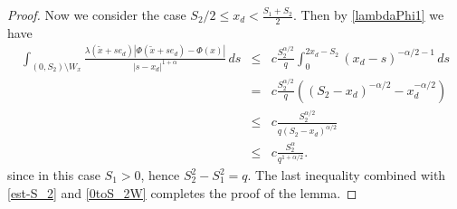 \documentclass[a4paper,12pt,reqno]{amsart}
\theoremstyle{definition}
\theoremstyle{remark}
\begin{document}
\begin{proof}
Now we consider  the case $S_2/2\le x_d< \frac{S_1+S_2}2$.   Then by \eqref{lambdaPhi1}    we have
\begin{eqnarray*}
\int_{(0, S_2) \setminus W_x} 
\frac{\lambda(\tilde{x} + s e_d) |\varPhi(\tilde{x} + s e_d) - \varPhi(x)|}{|s - x_d|^{1 + \alpha}} \, ds 
&\le&  c\frac{S^{\alpha/2}_2}{q }\int_{0}^{ 2x_d-S_2} (x_d - s)^{-\alpha/2-1}\, ds \nonumber\\
&=& c\frac{S^{\alpha/2}_2}{q }( (S_2 - x_d)^{-\alpha/2}- x_d^{-\alpha/2}) \nonumber\\
&\le& c\frac{S_2^{\alpha/2}}{q (S_2 - x_d)^{\alpha/2}} \nonumber\\
&\le& c\frac{S^{\alpha}_2}{q^{1+\alpha/2} }. 
\end{eqnarray*} 
since in this case 
$S_1>0$, hence  $S^2_2-S^2_1=q$.
The last inequality combined with \eqref{est-S_2} and \eqref{0toS_2W}  completes the proof of the lemma.
\end{proof}    
\end{document}
